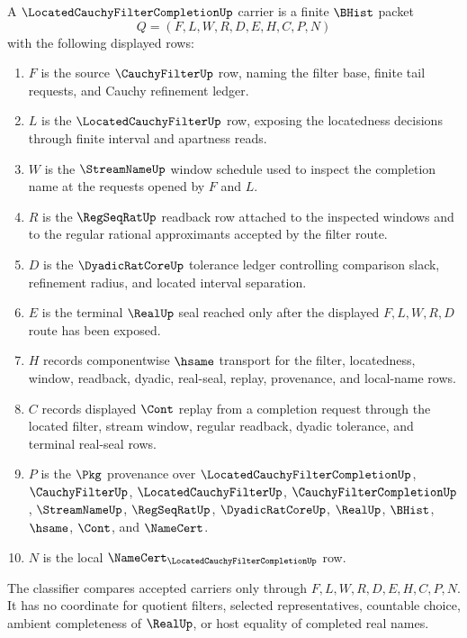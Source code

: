 \begin{definition}
\label{def:located-cauchy-filter-completion-carrier}
A $\LocatedCauchyFilterCompletionUp$ carrier is a finite $\BHist$ packet
$$
Q=(F,L,W,R,D,E,H,C,P,N)
$$
with the following displayed rows:
\begin{enumerate}
\item $F$ is the source $\CauchyFilterUp$ row, naming the filter base, finite tail requests, and Cauchy refinement ledger.
\item $L$ is the $\LocatedCauchyFilterUp$ row, exposing the locatedness decisions through finite interval and apartness reads.
\item $W$ is the $\StreamNameUp$ window schedule used to inspect the completion name at the requests opened by $F$ and $L$.
\item $R$ is the $\RegSeqRatUp$ readback row attached to the inspected windows and to the regular rational approximants accepted by the filter route.
\item $D$ is the $\DyadicRatCoreUp$ tolerance ledger controlling comparison slack, refinement radius, and located interval separation.
\item $E$ is the terminal $\RealUp$ seal reached only after the displayed $F,L,W,R,D$ route has been exposed.
\item $H$ records componentwise $\hsame$ transport for the filter, locatedness, window, readback, dyadic, real-seal, replay, provenance, and local-name rows.
\item $C$ records displayed $\Cont$ replay from a completion request through the located filter, stream window, regular readback, dyadic tolerance, and terminal real-seal rows.
\item $P$ is the $\Pkg$ provenance over $\LocatedCauchyFilterCompletionUp$, $\CauchyFilterUp$, $\LocatedCauchyFilterUp$, $\CauchyFilterCompletionUp$, $\StreamNameUp$, $\RegSeqRatUp$, $\DyadicRatCoreUp$, $\RealUp$, $\BHist$, $\hsame$, $\Cont$, and $\NameCert$.
\item $N$ is the local $\NameCert_{\LocatedCauchyFilterCompletionUp}$ row.
\end{enumerate}
The classifier compares accepted carriers only through $F,L,W,R,D,E,H,C,P,N$. It has no coordinate for quotient filters, selected representatives, countable choice, ambient completeness of $\RealUp$, or host equality of completed real names.
\end{definition}

